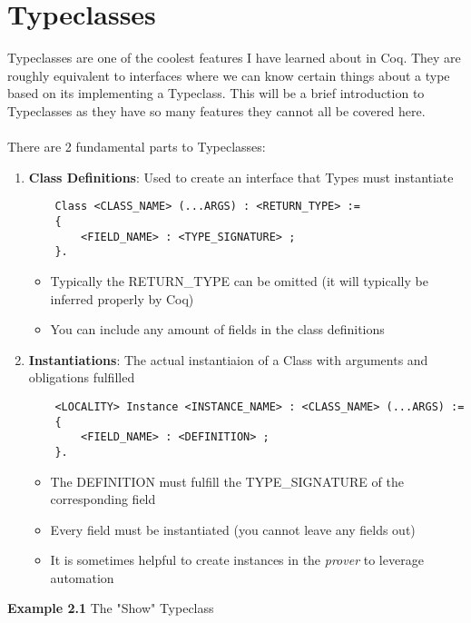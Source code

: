 \documentclass{article}
\begin{document}
    \section{Typeclasses}
    Typeclasses are one of the coolest features I have learned about in Coq. They are roughly equivalent to interfaces where we can know certain things about a type based on its implementing a Typeclass. 
    This will be a brief introduction to Typeclasses as they have so many features they cannot all be covered here.
    \\~\\
    There are 2 fundamental parts to Typeclasses:
    \begin{enumerate}
        \item \textbf{Class Definitions}: Used to create an interface that Types must instantiate
        \begin{verbatim}
    Class <CLASS_NAME> (...ARGS) : <RETURN_TYPE> := 
    {
        <FIELD_NAME> : <TYPE_SIGNATURE> ; 
    }.
        \end{verbatim} 
        
        \begin{itemize}
            \item Typically the RETURN\_TYPE can be omitted (it will typically be inferred properly by Coq)
            \item You can include any amount of fields in the class definitions
        \end{itemize} 

        \item \textbf{Instantiations}: The actual instantiaion of a Class with arguments and obligations fulfilled
        \begin{verbatim}
    <LOCALITY> Instance <INSTANCE_NAME> : <CLASS_NAME> (...ARGS) :=
    {
        <FIELD_NAME> : <DEFINITION> ;
    }.
        \end{verbatim}
        \begin{itemize}
            \item The DEFINITION must fulfill the TYPE\_SIGNATURE of the corresponding field
            \item Every field must be instantiated (you cannot leave any fields out)
            \item It is sometimes helpful to create instances in the \emph{prover} to leverage automation
        \end{itemize}
    \end{enumerate}
    \textbf{Example 2.1} The "Show" Typeclass \\
\end{document}
